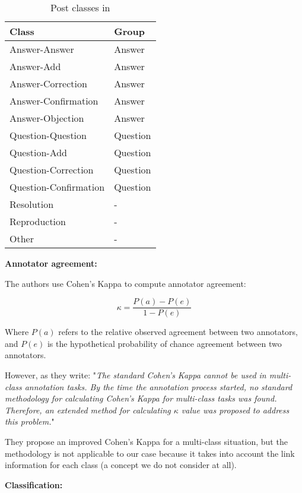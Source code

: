 \documentclass[11pt]{article}
\begin{document}
\begin{table}
	\begin{tabularx}{\textwidth}{Y Y}
		Class & Group \\
		\toprule
		Answer-Answer & Answer \\
		Answer-Add & Answer \\
		Answer-Correction & Answer \\
		Answer-Confirmation & Answer \\
		Answer-Objection & Answer \\
		\midrule
		Question-Question & Question \\
		Question-Add & Question \\
		Question-Correction & Question \\
		Question-Confirmation & Question \\
		\midrule
		Resolution & - \\
		Reproduction & - \\
		Other & - \\
		\bottomrule
	\end{tabularx}
	\caption{Post classes in \cite{kim2010taggingandlinking}}
	\label{fig:postClasses}
\end{table}

\vspace{0.5cm}
\textbf{Annotator agreement:}
\vspace{0.1cm}

The authors use Cohen's Kappa to compute annotator agreement:

$$\kappa = \frac{P(a) - P(e)}{1 - P(e)}$$

Where $P(a)$ refers to the relative observed agreement between two annotators, and $P(e)$ is the hypothetical probability of chance agreement between two annotators.

However, as they write: "\textit{The standard Cohen’s Kappa cannot be used in multi-class annotation tasks. By the time the annotation process started, no standard methodology for calculating Cohen’s Kappa for multi-class tasks was found. Therefore, an extended method for calculating $\kappa$ value was proposed to address this problem.}"

They propose an improved Cohen's Kappa for a multi-class situation, but the methodology is not applicable to our case because it takes into account the link information for each class (a concept we do not consider at all).

\vspace{0.5cm}
\textbf{Classification:}
\vspace{0.1cm}
\end{document}
